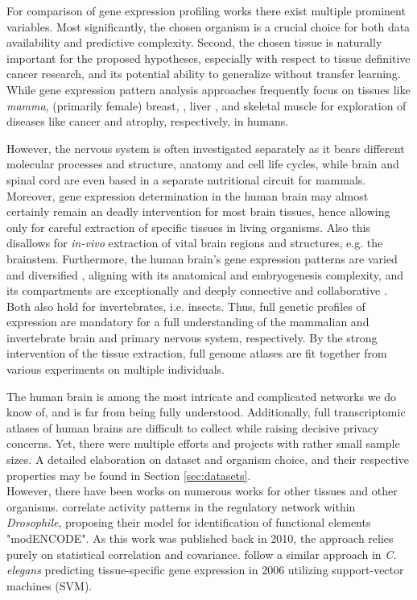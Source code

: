 \documentclass[]{article}
\renewcommand{\cite}{\citep}
\begin{document}
For comparison of gene expression profiling works there exist multiple prominent variables. Most significantly, the chosen organism is a crucial choice for both data availability and predictive complexity. Second, the chosen tissue is naturally important for the proposed hypotheses, especially with respect to tissue definitive cancer research, and its potential ability to generalize without transfer learning. While gene expression pattern analysis approaches frequently focus on tissues like \textit{mamma}, (primarily female) breast, \cite{herschkowitz2007identification}, liver \cite{flores2002patterns}, and skeletal muscle \cite{lecker2004multiple} for exploration of diseases like cancer and atrophy, respectively, in humans. 

However, the nervous system is often investigated separately as it bears different molecular processes and structure, anatomy and cell life cycles, while brain and spinal cord are even based in a separate nutritional circuit for mammals. Moreover, gene expression determination in the human brain may almost certainly remain an deadly intervention for most brain tissues, hence allowing only for careful extraction of specific tissues in living organisms. Also this disallows for \textit{in-vivo} extraction of vital brain regions and structures, e.g. the brainstem. Furthermore, the human brain's gene expression patterns are varied and diversified \cite{ramasamy2014genetic}, aligning with its anatomical and embryogenesis complexity, and its compartments are exceptionally and deeply connective and collaborative \cite{fornito2015connectomics}. Both also hold for invertebrates, i.e. insects. Thus, full genetic profiles of expression are mandatory for a full understanding of the mammalian and invertebrate brain and primary nervous system, respectively. By the strong intervention of the tissue extraction, full genome atlases are fit together from various experiments on multiple individuals.

The human brain is among the most intricate and complicated networks we do know of, and is far from being fully understood. Additionally, full transcriptomic atlases of human brains are difficult to collect while raising decisive privacy concerns. Yet, there were multiple efforts and projects with rather small sample sizes. A detailed elaboration on dataset and organism choice, and their respective properties may be found in Section \ref{sec:datasets}. \\

However, there have been works on numerous works for other tissues and other organisms. \citet{modencode2010identification} correlate activity patterns in the regulatory network within \textit{Drosophile}, proposing their model for identification of functional elements "modENCODE". As this work was published back in 2010, the approach relies purely on statistical correlation and covariance. \citet{chikina2009global} follow a similar approach in \textit{C. elegans} predicting tissue-specific gene expression in 2006 utilizing support-vector machines (SVM)\cite{noble2006support}. 
\end{document}
